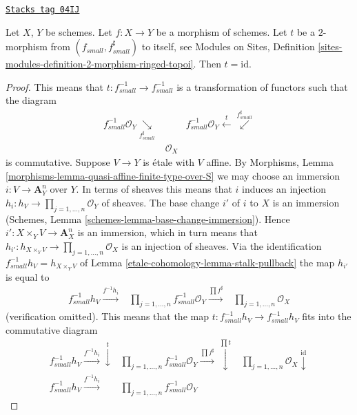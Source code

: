 \begin{lemma}[2 morphism]
\label{etale-cohomology-lemma-2-morphism}
\href{https://stacks.math.columbia.edu/tag/04IJ}{\texttt{Stacks tag 04IJ}}

Let $X$, $Y$ be schemes. Let $f : X \to Y$ be a morphism of schemes.
Let $t$ be a $2$-morphism from $(f_{small}, f_{small}^\sharp)$ to itself, see
Modules on Sites,
Definition \ref{sites-modules-definition-2-morphism-ringed-topoi}.
Then $t = \text{id}$.
\end{lemma}

\begin{proof}
This means that $t : f^{-1}_{small} \to f^{-1}_{small}$
is a transformation of functors such that the diagram
$$
\begin{array}{ccc}f_{small}^{-1}\mathcal{O}_Y
\underset{f_{small}^\sharp}{\searrow} &  & f_{small}^{-1}\mathcal{O}_Y \overset{t}{\longleftarrow}\overset{f_{small}^\sharp}{\swarrow} \\  & \mathcal{O}_X & \end{array}
$$
is commutative. Suppose $V \to Y$ is \'etale with $V$ affine. By
Morphisms, Lemma \ref{morphisms-lemma-quasi-affine-finite-type-over-S}
we may choose an immersion $i : V \to \mathbf{A}^n_Y$ over $Y$.
In terms of sheaves this means that $i$ induces an injection
$h_i : h_V \to \prod_{j = 1, \ldots, n} \mathcal{O}_Y$ of sheaves.
The base change $i'$ of $i$ to $X$ is an immersion
(Schemes, Lemma \ref{schemes-lemma-base-change-immersion}).
Hence $i' : X \times_Y V \to \mathbf{A}^n_X$ is an immersion, which
in turn means that
$h_{i'} : h_{X \times_Y V} \to \prod_{j = 1, \ldots, n} \mathcal{O}_X$
is an injection of sheaves.
Via the identification $f_{small}^{-1}h_V = h_{X \times_Y V}$ of
Lemma \ref{etale-cohomology-lemma-stalk-pullback}
the map $h_{i'}$ is equal to
$$
\begin{array}{ccc}f_{small}^{-1}h_V \overset{f^{-1}h_i}{\longrightarrow} & \prod_{j = 1, \ldots, n} f_{small}^{-1}\mathcal{O}_Y
\overset{\prod f^\sharp}{\longrightarrow} & \prod_{j = 1, \ldots, n} \mathcal{O}_X\end{array}
$$
(verification omitted). This means that the map
$t : f_{small}^{-1}h_V \to f_{small}^{-1}h_V$
fits into the commutative diagram
$$
\begin{array}{ccc}f_{small}^{-1}h_V \overset{f^{-1}h_i}{\longrightarrow}\overset{t}{\downarrow} & \prod_{j = 1, \ldots, n} f_{small}^{-1}\mathcal{O}_Y
\overset{\prod f^\sharp}{\longrightarrow}\overset{\prod t}{\downarrow} & \prod_{j = 1, \ldots, n} \mathcal{O}_X \overset{\text{id}}{\downarrow} \\ f_{small}^{-1}h_V \overset{f^{-1}h_i}{\longrightarrow} & \prod_{j = 1, \ldots, n} f_{small}^{-1}\mathcal{O}_Y

\end{array}$$
\end{proof}
